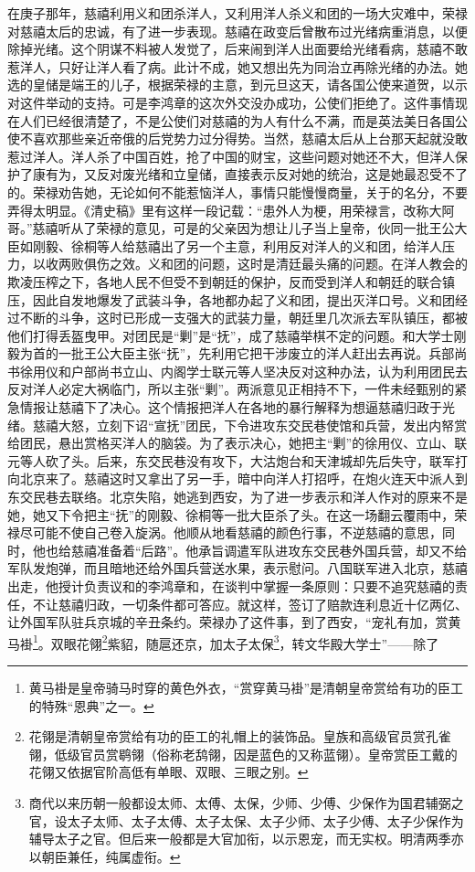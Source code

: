   在庚子那年，慈禧利用义和团杀洋人，又利用洋人杀义和团的一场大灾难中，荣禄对慈禧太后的忠诚，有了进一步表现。慈禧在政变后曾散布过光绪病重消息，以便除掉光绪。这个阴谋不料被人发觉了，后来闹到洋人出面要给光绪看病，慈禧不敢惹洋人，只好让洋人看了病。此计不成，她又想出先为同治立再除光绪的办法。她选的皇储是端王的儿子，根据荣禄的主意，到元旦这天，请各国公使来道贺，以示对这件举动的支持。可是李鸿章的这次外交没办成功，公使们拒绝了。这件事情现在人们已经很清楚了，不是公使们对慈禧的为人有什么不满，而是英法美日各国公使不喜欢那些亲近帝俄的后党势力过分得势。当然，慈禧太后从上台那天起就没敢惹过洋人。洋人杀了中国百姓，抢了中国的财宝，这些问题对她还不大，但洋人保护了康有为，又反对废光绪和立皇储，直接表示反对她的统治，这是她最忍受不了的。荣禄劝告她，无论如何不能惹恼洋人，事情只能慢慢商量，关于的名分，不要弄得太明显。《清史稿》里有这样一段记载：“患外人为梗，用荣禄言，改称大阿哥。”慈禧听从了荣禄的意见，可是的父亲因为想让儿子当上皇帝，伙同一批王公大臣如刚毅、徐桐等人给慈禧出了另一个主意，利用反对洋人的义和团，给洋人压力，以收两败俱伤之效。义和团的问题，这时是清廷最头痛的问题。在洋人教会的欺凌压榨之下，各地人民不但受不到朝廷的保护，反而受到洋人和朝廷的联合镇压，因此自发地爆发了武装斗争，各地都办起了义和团，提出灭洋口号。义和团经过不断的斗争，这时已形成一支强大的武装力量，朝廷里几次派去军队镇压，都被他们打得丢盔曳甲。对团民是“剿”是“抚”，成了慈禧举棋不定的问题。和大学士刚毅为首的一批王公大臣主张“抚”，先利用它把干涉废立的洋人赶出去再说。兵部尚书徐用仪和户部尚书立山、内阁学士联元等人坚决反对这种办法，认为利用团民去反对洋人必定大祸临门，所以主张“剿”。两派意见正相持不下，一件未经甄别的紧急情报让慈禧下了决心。这个情报把洋人在各地的暴行解释为想逼慈禧归政于光绪。慈禧大怒，立刻下诏“宣抚”团民，下令进攻东交民巷使馆和兵营，发出内帑赏给团民，悬出赏格买洋人的脑袋。为了表示决心，她把主“剿”的徐用仪、立山、联元等人砍了头。后来，东交民巷没有攻下，大沽炮台和天津城却先后失守，联军打向北京来了。慈禧这时又拿出了另一手，暗中向洋人打招呼，在炮火连天中派人到东交民巷去联络。北京失陷，她逃到西安，为了进一步表示和洋人作对的原来不是她，她又下令把主“抚”的刚毅、徐桐等一批大臣杀了头。在这一场翻云覆雨中，荣禄尽可能不使自己卷入旋涡。他顺从地看慈禧的颜色行事，不逆慈禧的意思，同时，他也给慈禧准备着“后路”。他承旨调遣军队进攻东交民巷外国兵营，却又不给军队发炮弹，而且暗地还给外国兵营送水果，表示慰问。八国联军进入北京，慈禧出走，他授计负责议和的李鸿章和，在谈判中掌握一条原则：只要不追究慈禧的责任，不让慈禧归政，一切条件都可答应。就这样，签订了赔款连利息近十亿两亿、让外国军队驻兵京城的辛丑条约。荣禄办了这件事，到了西安，“宠礼有加，赏黄马褂\footnote{黄马褂是皇帝骑马时穿的黄色外衣，“赏穿黄马褂”是清朝皇帝赏给有功的臣工的特殊“恩典”之一。}。双眼花翎\footnote{花翎是清朝皇帝赏给有功的臣工的礼帽上的装饰品。皇族和高级官员赏孔雀翎，低级官员赏鹖翎（俗称老鸹翎，因是蓝色的又称蓝翎）。皇帝赏臣工戴的花翎又依据官阶高低有单眼、双眼、三眼之别。}紫貂，随扈还京，加太子太保\footnote{商代以来历朝一般都设太师、太傅、太保，少师、少傅、少保作为国君辅弼之官，设太子太师、太子太傅、太子太保、太子少师、太子少傅、太子少保作为辅导太子之官。但后来一般都是大官加衔，以示恩宠，而无实权。明清两季亦以朝臣兼任，纯属虚衔。}，转文华殿大学士”——除了